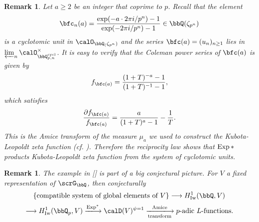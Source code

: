 \documentclass[a4paper,oneside]{amsart}
\newtheorem{remark}[theorem]{Remark}
\numberwithin{equation}{section}
\numberwithin{figure}{section}
\begin{document}
\begin{remark}
    Let $a\geq 2$ be an integer that coprime to $p$. Recall that the element
    $$\bfc_n(a)=\frac{\exp(-a\cdot2\pi i/p^n)-1}{\exp(-2\pi i/p^n)-1}\in\bbQ(\zeta_{p^n})$$
    is a cyclotomic unit in $\calO_{\bbQ_(\zeta_{p^n})}$ and the series $\bfc(a)=(u_n)_{n\geq 1}$ lies in $\varprojlim_n \calO_{\bbQ_{p,n}^{\opn{cycl}}}^\times$. It is easy to verify that the Coleman power series of $\bfc(a)$ is given by
    $$f_{\bfc(a)}=\frac{(1+T)^{-a}-1}{(1+T)^{-1}-1},$$
    which satisfies
    $$\frac{\partial f_{\bfc(a)}}{f_{\bfc(a)}}=\frac{a}{(1+T)^a-1}-\frac{1}{T}.$$
    This is the Amice transform of the measure $\mu_a$ we used to construct the Kubota-Leopoldt zeta function (cf. \cite[Proposition 1.6]{Col}). Therefore the reciprocity law shows that $\operatorname{Exp}*$ products Kubota-Leopoldt zeta function from the system of cyclotomic units.
\end{remark}
\begin{remark}
    The example in [] is part of a big conjectural picture. For $V$ a fixed representation of $\scrG_\bbQ$, then conjecturally
    $$\{\text{compatible system of global elements of $V$}\}\lto H_{\opn{Iw}}^1(\bbQ,V)$$
    $$\lto H_{\opn{Iw}}^1(\bbQ_p,V)\xlto{\opn{Exp}^*}\calD(V)^{\psi=1}\xlto[\text{transform}]{\text{Amice}} p\text{-adic $L$-functions}.$$
\end{remark}
\printbibliography
\end{document}
